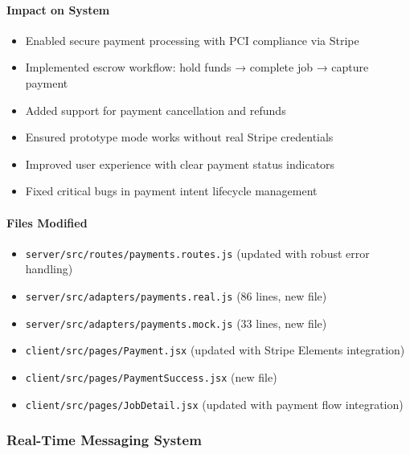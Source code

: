 \documentclass[11pt]{article}
\begin{document}
\paragraph{Impact on System}
\begin{itemize}[leftmargin=1.4em]
  \item Enabled secure payment processing with PCI compliance via Stripe
  \item Implemented escrow workflow: hold funds → complete job → capture payment
  \item Added support for payment cancellation and refunds
  \item Ensured prototype mode works without real Stripe credentials
  \item Improved user experience with clear payment status indicators
  \item Fixed critical bugs in payment intent lifecycle management
\end{itemize}

\paragraph{Files Modified}
\begin{itemize}[leftmargin=1.4em]
  \item \texttt{server/src/routes/payments.routes.js} (updated with robust error handling)
  \item \texttt{server/src/adapters/payments.real.js} (86 lines, new file)
  \item \texttt{server/src/adapters/payments.mock.js} (33 lines, new file)
  \item \texttt{client/src/pages/Payment.jsx} (updated with Stripe Elements integration)
  \item \texttt{client/src/pages/PaymentSuccess.jsx} (new file)
  \item \texttt{client/src/pages/JobDetail.jsx} (updated with payment flow integration)
\end{itemize}

\subsubsection{Real-Time Messaging System}
\end{document}
